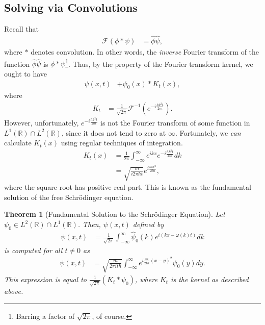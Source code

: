 \documentclass[10pt]{extarticle}
\newcommand{\R}{\mathbb{R}}
\theoremstyle{plain}
\newtheorem*{theorem}{Theorem}%
\theoremstyle{definition}
\theoremstyle{remark}
\begin{document}
  \subsection{Solving via Convolutions}%
  Recall that
  \begin{align*}
    \mathcal{F}(\phi \ast \psi) &= \hat{\phi}\hat{\psi},
  \end{align*}
  where $\ast$ denotes convolution. In other words, the \textit{inverse} Fourier transform of the function $\hat{\phi}\hat{\psi}$ is $\phi \ast \psi$\footnote{Barring a factor of $\sqrt{2\pi}$, of course.}. Thus, by the property of the Fourier transform kernel, we ought to have
  \begin{align*}
    \psi(x,t) &+ \psi_0(x)\ast K_t(x),
  \end{align*}
  where
  \begin{align*}
    K_t &= \frac{1}{\sqrt{2\pi}}\mathcal{F}^{-1}\left(e^{-i\frac{\hbar k^2 t}{2m}}\right).
  \end{align*}
  However, unfortunately, $e^{-i\frac{\hbar k^2 t}{2m}}$ is not the Fourier transform of some function in $L^{1}(\R)\cap L^{2}(\R)$, since it does not tend to zero at $\infty$. Fortunately, we \textit{can} calculate $K_t(x)$ using regular techniques of integration.
  \begin{align*}
    K_t(x) &= \frac{1}{2\pi}\int_{-\infty}^{\infty}e^{ikx}e^{-i\frac{\hbar k^2t}{2m}}dk\\
           &= \sqrt{\frac{m}{i2\pi \hbar t}}e^{i\frac{mx^2}{2t\hbar}},
  \end{align*}
  where the square root has positive real part. This is known as the fundamental solution of the free Schrödinger equation.
  \begin{theorem}[Fundamental Solution to the Schrödinger Equation]
    Let $\psi_0\in L^{2}(\R)\cap L^{1}(\R)$. Then, $\psi(x,t)$ defined by
    \begin{align*}
      \psi(x,t) &= \frac{1}{\sqrt{2\pi}} \int_{-\infty}^{\infty} \hat{\psi}_0(k)e^{i(kx - \omega(k)t)} dk
    \end{align*}
    is computed for all $t\neq 0$ as
    \begin{align*}
      \psi(x,t) &= \sqrt{\frac{m}{2\pi i t\hbar}}\int_{-\infty}^{\infty} e^{i\frac{m}{2t\hbar}(x-y)^2}\psi_0(y) dy.
    \end{align*}
    This expression is equal to $\frac{1}{\sqrt{2\pi}}\left(K_t\ast \psi_0\right)$, where $K_t$ is the kernel as described above.
  \end{theorem}
\end{document}
